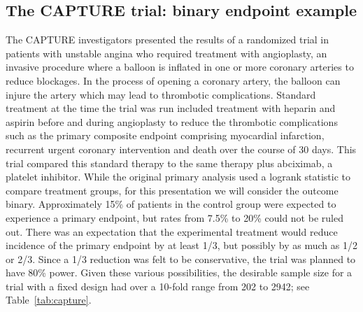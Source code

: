 
\subsection{The CAPTURE trial: binary endpoint example}
The CAPTURE investigators \cite{CAPTURE} presented the results of a randomized trial in patients with unstable angina who required treatment with angioplasty, an invasive procedure where a balloon is inflated in one or more coronary arteries to reduce blockages. In the process of opening a coronary artery, the balloon can injure the artery which may lead to thrombotic complications. Standard treatment at the time the trial was run included treatment with heparin and aspirin before and during angioplasty to reduce the thrombotic complications such as the primary composite endpoint comprising myocardial infarction, recurrent urgent coronary intervention and death over the course of 30 days. This trial compared this standard therapy to the same therapy plus abciximab, a platelet inhibitor. While the original primary analysis used a logrank statistic to compare treatment groups, for this presentation we will consider the outcome binary. Approximately 15\% of patients in the control group were expected to experience a primary endpoint, but rates from 7.5\% to 20\% could not be ruled out. There was an expectation that the experimental treatment would reduce incidence of the primary endpoint by at least 1/3, but possibly by as much as 1/2 or 2/3. Since a 1/3 reduction was felt to be conservative, the trial was planned to have 80\% power. Given these various possibilities, the desirable sample size for a trial with a fixed design had over a 10-fold range from 202 to 2942; see Table~\ref{tab:capture}.  

